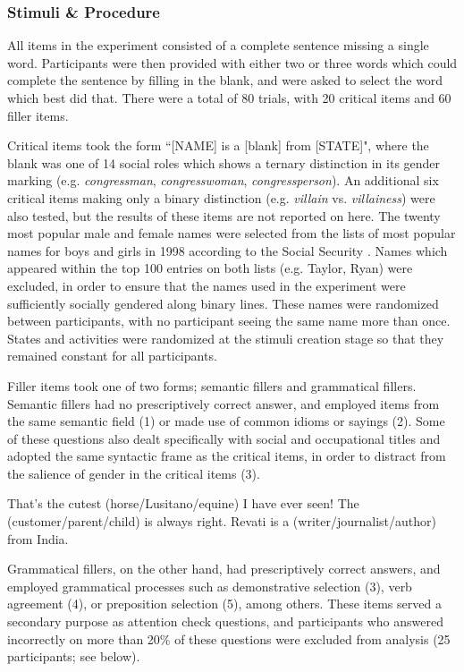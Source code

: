 \documentclass[10pt,letterpaper]{article}
\begin{document}
	\subsubsection{Stimuli \& Procedure} All items in the experiment consisted of a complete sentence missing a single word. Participants were then provided with either two or three words which could complete the sentence by filling in the blank, and were asked to select the word which best did that. There were a total of 80 trials, with 20 critical items and 60 filler items.\par 
	Critical items took the form ``[NAME] is a [blank] from [STATE]", where the blank was one of 14 social roles which shows a ternary distinction in its gender marking (e.g. \textit{congressman}, \textit{congresswoman}, \textit{congressperson}). An additional six critical items making only a binary distinction (e.g. \textit{villain} vs. \textit{villainess}) were also tested, but the results of these items are not reported on here. The twenty most popular male and female names were selected from the lists of most popular names for boys and girls in 1998 according to the Social Security \textcite{socialsecurity}. Names which appeared within the top 100 entries on both lists (e.g. Taylor, Ryan) were excluded, in order to ensure that the names used in the experiment were sufficiently socially gendered along binary lines. These names were randomized between participants, with no participant seeing the same name more than once. States and activities were randomized at the stimuli creation stage so that they remained constant for all participants.\par 
	Filler items took one of two forms; semantic fillers and grammatical fillers. Semantic fillers had no prescriptively correct answer, and employed items from the same semantic field (1) or made use of common idioms or sayings (2). Some of these questions also dealt specifically with social and occupational titles and adopted the same syntactic frame as the critical items, in order to distract from the salience of gender in the critical items (3). 
	
	\begin{exe}
		\ex That's the cutest (horse/Lusitano/equine) I have ever seen!
		\ex The (customer/parent/child) is always right.
		\ex Revati is a (writer/journalist/author) from India.
	\end{exe}
	
	Grammatical fillers, on the other hand, had prescriptively correct answers, and employed grammatical processes such as demonstrative selection (3), verb agreement (4), or preposition selection (5), among others. These items served a secondary purpose as attention check questions, and participants who answered incorrectly on more than 20\% of these questions were excluded from analysis (25 participants; see below).
	
\end{document}
